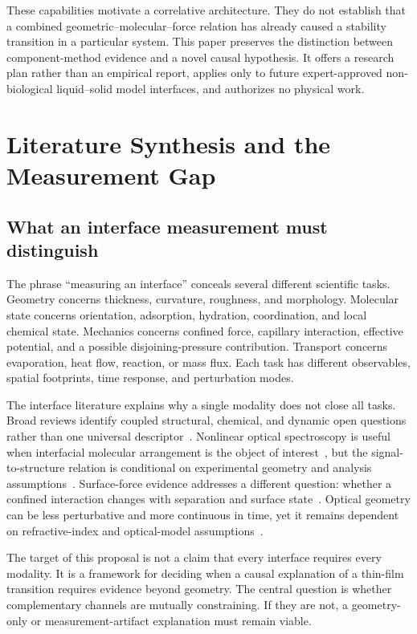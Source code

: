 \documentclass[conference]{IEEEtran}
\begin{document}
These capabilities motivate a correlative architecture. They do not establish that a combined geometric--molecular--force relation has already caused a stability transition in a particular system. This paper preserves the distinction between component-method evidence and a novel causal hypothesis. It offers a research plan rather than an empirical report, applies only to future expert-approved non-biological liquid--solid model interfaces, and authorizes no physical work.

\section{Literature Synthesis and the Measurement Gap}

\subsection{What an interface measurement must distinguish}

The phrase ``measuring an interface'' conceals several different scientific tasks. Geometry concerns thickness, curvature, roughness, and morphology. Molecular state concerns orientation, adsorption, hydration, coordination, and local chemical state. Mechanics concerns confined force, capillary interaction, effective potential, and a possible disjoining-pressure contribution. Transport concerns evaporation, heat flow, reaction, or mass flux. Each task has different observables, spatial footprints, time response, and perturbation modes.

The interface literature explains why a single modality does not close all tasks. Broad reviews identify coupled structural, chemical, and dynamic open questions rather than one universal descriptor~\cite{bjorneholm2016}. Nonlinear optical spectroscopy is useful when interfacial molecular arrangement is the object of interest~\cite{backus2020}, but the signal-to-structure relation is conditional on experimental geometry and analysis assumptions~\cite{wang2005}. Surface-force evidence addresses a different question: whether a confined interaction changes with separation and surface state~\cite{dziadkowiec2019}. Optical geometry can be less perturbative and more continuous in time, yet it remains dependent on refractive-index and optical-model assumptions~\cite{shoji2024}.

The target of this proposal is not a claim that every interface requires every modality. It is a framework for deciding when a causal explanation of a thin-film transition requires evidence beyond geometry. The central question is whether complementary channels are mutually constraining. If they are not, a geometry-only or measurement-artifact explanation must remain viable.
\end{document}
